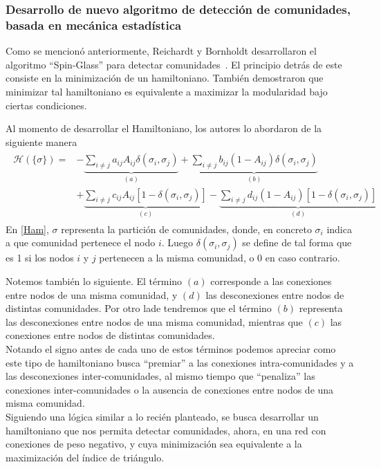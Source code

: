 \documentclass{proyectotesis}
\begin{document}
\subsubsection{Desarrollo de nuevo algoritmo de detección de comunidades, basada en mecánica estadística} 
Como se mencionó anteriormente, Reichardt y Bornholdt desarrollaron el algoritmo ``Spin-Glass'' para detectar comunidades~\cite{reichardt_statistical_2006}. El principio detrás de este consiste en la minimización de un hamiltoniano. También demostraron que minimizar tal hamiltoniano es equivalente a maximizar la modularidad bajo ciertas condiciones.

Al momento de desarrollar el Hamiltoniano, los autores lo abordaron de la siguiente manera
\begin{align}
\begin{split}
    \mathcal{H}(\{\sigma\}) = &- \underbrace{\sum_{i\neq j} a_{ij}A_{ij}\delta(\sigma_i,\sigma_j)}_{(a)} + \underbrace{\sum_{i\neq j} b_{ij}(1 - A_{ij})\delta(\sigma_i,\sigma_j)}_{(b)} \\
                              &+ \underbrace{\sum_{i\neq j} c_{ij} A_{ij}[1 - \delta(\sigma_i,\sigma_j)] }_{(c)} - \underbrace{\sum_{i\neq j} d_{ij} (1-A_{ij})[1 - \delta(\sigma_i,\sigma_j)]}_{(d)}
\end{split}
\label{Ham}
\end{align}
En \eqref{Ham}, $\sigma$ representa la partición de comunidades, donde, en concreto $\sigma_i$ indica a que comunidad pertenece el nodo $i$. Luego $\delta(\sigma_i,\sigma_j)$ se define de tal forma que es 1 si los nodos $i$ y $j$ pertenecen a la misma comunidad, o 0 en caso contrario.

Notemos también lo siguiente. El término $(a)$ corresponde a las conexiones entre nodos de una misma comunidad, y $(d)$ las desconexiones entre nodos de distintas comunidades. Por otro lade tendremos que el término  $(b)$ representa las desconexiones entre nodos de una misma comunidad, mientras que $(c)$ las conexiones entre nodos de distintas comunidades.\\

Notando el signo antes de cada uno de estos términos podemos apreciar como este tipo de hamiltoniano busca ``premiar'' a las conexiones intra-comunidades y a las desconexiones inter-comunidades, al mismo tiempo que ``penaliza'' las conexiones inter-comunidades o la ausencia de conexiones entre nodos de una misma comunidad.
\\

Siguiendo una lógica similar a lo recién planteado, se busca desarrollar un hamiltoniano que nos permita detectar comunidades, ahora, en una red con conexiones de peso negativo, y cuya minimización sea equivalente a la maximización del índice de triángulo.
\end{document}
